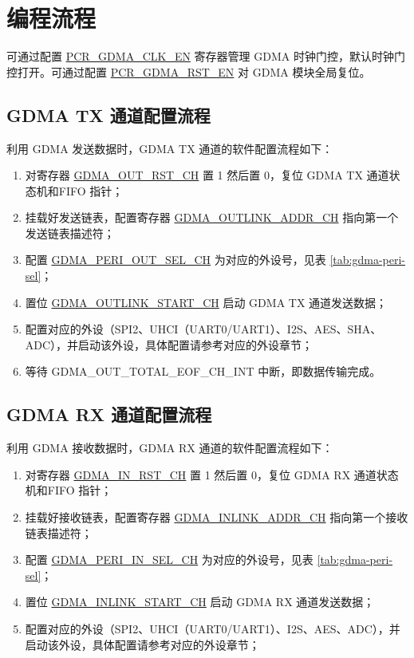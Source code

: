 \documentclass[main\_\_CN.tex]{subfiles}
\begin{document}
\section{编程流程}

可通过配置 \hyperref[fielddesc:PCRGDMACLKEN]{PCR\_GDMA\_CLK\_EN} 寄存器管理 GDMA 时钟门控，默认时钟门控打开。可通过配置 \hyperref[fielddesc:PCRGDMARSTEN]{PCR\_GDMA\_RST\_EN} 对 GDMA 模块全局复位。

\subsection{GDMA TX 通道配置流程}
利用 GDMA 发送数据时，GDMA TX 通道的软件配置流程如下：
\begin{enumerate}
    \item 对寄存器 \hyperref[fielddesc:GDMAOUTRSTCHN]{GDMA\_OUT\_RST\_CH} 置 1 然后置 0，复位 GDMA TX 通道状态机和FIFO 指针；
    \item 挂载好发送链表，配置寄存器 \hyperref[fielddesc:GDMAOUTLINKADDRCHN]{GDMA\_OUTLINK\_ADDR\_CH} 指向第一个发送链表描述符；
    \item 配置 \hyperref[fielddesc:GDMAPERIOUTSELCHN]{GDMA\_PERI\_OUT\_SEL\_CH} 为对应的外设号，见表 \ref{tab:gdma-peri-sel}；
    \item 置位 \hyperref[fielddesc:GDMAOUTLINKSTARTCHN]{GDMA\_OUTLINK\_START\_CH} 启动 GDMA TX 通道发送数据；
    \item 配置对应的外设（SPI2、UHCI（UART0/UART1）、I2S、AES、SHA、ADC），并启动该外设，具体配置请参考对应的外设章节；
    \item 等待 GDMA\_OUT\_TOTAL\_EOF\_CH\_INT 中断，即数据传输完成。
\end{enumerate}

\subsection{GDMA RX 通道配置流程}
利用 GDMA 接收数据时，GDMA RX 通道的软件配置流程如下：
\begin{enumerate}
    \item 对寄存器 \hyperref[fielddesc:GDMAINRSTCHN]{GDMA\_IN\_RST\_CH} 置 1 然后置 0，复位 GDMA RX 通道状态机和FIFO 指针；
    \item 挂载好接收链表，配置寄存器 \hyperref[fielddesc:GDMAINLINKADDRCHN]{GDMA\_INLINK\_ADDR\_CH} 指向第一个接收链表描述符；
    \item 配置 \hyperref[fielddesc:GDMAPERIINSELCHN]{GDMA\_PERI\_IN\_SEL\_CH} 为对应的外设号，见表 \ref{tab:gdma-peri-sel}；
    \item 置位 \hyperref[fielddesc:GDMAINLINKSTARTCHN]{GDMA\_INLINK\_START\_CH} 启动 GDMA RX 通道发送数据；
    \item 配置对应的外设（SPI2、UHCI（UART0/UART1）、I2S、AES、ADC），并启动该外设，具体配置请参考对应的外设章节；
\end{enumerate}
\end{document}
